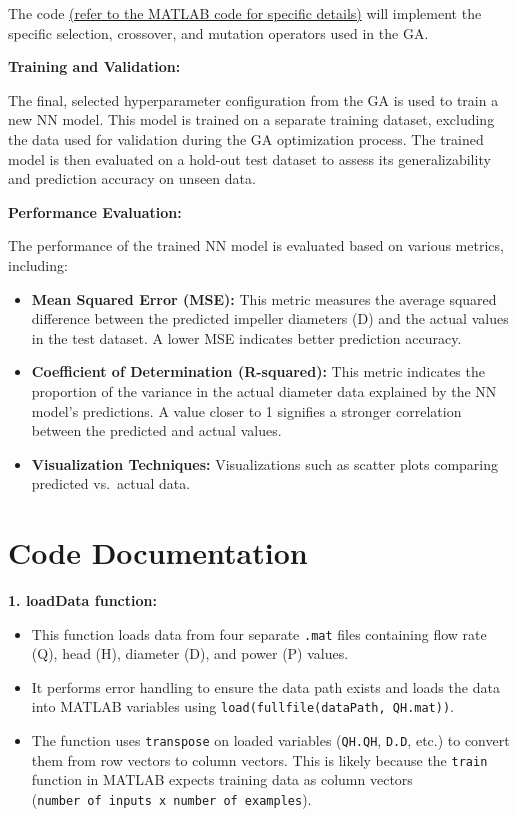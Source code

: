 \documentclass[
  super,
  review,
  3p]{elsarticle}
\providecommand{\tightlist}{%
  \setlength{\itemsep}{0pt}\setlength{\parskip}{0pt}}\usepackage{longtable,booktabs,array}
\begin{document}
The code
\href{https://github.com/MohammedTwheed/trimming-code/blob/main/trimming_code.m}{(refer
to the MATLAB code for specific details)} will implement the specific
selection, crossover, and mutation operators used in the GA.

\textbf{Training and Validation:}

The final, selected hyperparameter configuration from the GA is used to
train a new NN model. This model is trained on a separate training
dataset, excluding the data used for validation during the GA
optimization process. The trained model is then evaluated on a hold-out
test dataset to assess its generalizability and prediction accuracy on
unseen data.

\textbf{Performance Evaluation:}

The performance of the trained NN model is evaluated based on various
metrics, including:

\begin{itemize}
\tightlist
\item
  \textbf{Mean Squared Error (MSE):} This metric measures the average
  squared difference between the predicted impeller diameters (D) and
  the actual values in the test dataset. A lower MSE indicates better
  prediction accuracy.
\item
  \textbf{Coefficient of Determination (R-squared):} This metric
  indicates the proportion of the variance in the actual diameter data
  explained by the NN model's predictions. A value closer to 1 signifies
  a stronger correlation between the predicted and actual values.
\item
  \textbf{Visualization Techniques:} Visualizations such as scatter
  plots comparing predicted vs.~actual data.
\end{itemize}

\section{Code Documentation}\label{code-documentation}

\textbf{1. loadData function:}

\begin{itemize}
\tightlist
\item
  This function loads data from four separate \texttt{.mat} files
  containing flow rate (Q), head (H), diameter (D), and power (P)
  values.
\item
  It performs error handling to ensure the data path exists and loads
  the data into MATLAB variables using
  \texttt{load(fullfile(dataPath,\ \textquotesingle{}QH.mat\textquotesingle{}))}.
\item
  The function uses \texttt{transpose} on loaded variables
  (\texttt{QH.QH}, \texttt{D.D}, etc.) to convert them from row vectors
  to column vectors. This is likely because the \texttt{train} function
  in MATLAB expects training data as column vectors
  (\texttt{number\ of\ inputs\ x\ number\ of\ examples}).
\end{itemize}
\end{document}
